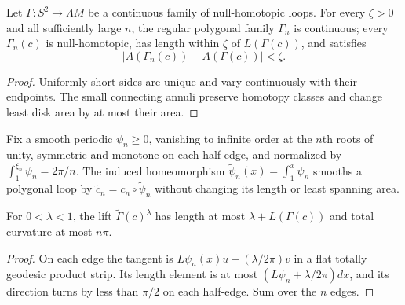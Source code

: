 \begin{corollary}
\label{cor:polygonal-approximation-of-family}
\label{Gammaapprox}
Let $\Gamma\colon S^2\to\Lambda M$ be a continuous family of null-homotopic
loops. For every $\zeta>0$ and all sufficiently large $n$, the regular
polygonal family $\Gamma_n$ is continuous; every $\Gamma_n(c)$ is
null-homotopic, has length within $\zeta$ of $L(\Gamma(c))$, and satisfies
\[
|A(\Gamma_n(c))-A(\Gamma(c))|<\zeta.
\]
\end{corollary}
\begin{proof}
\sketch Uniformly short sides are unique and vary continuously with their endpoints.
The small connecting annuli preserve homotopy classes and change least disk
area by at most their area.
\end{proof}

Fix a smooth periodic $\psi_n\ge0$, vanishing to infinite order at the
$n$th roots of unity, symmetric and monotone on each half-edge, and normalized
by $\int_1^{\xi_n}\psi_n=2\pi/n$. The induced homeomorphism
$\widetilde\psi_n(x)=\int_1^x\psi_n$ smooths a polygonal loop by
$\widetilde c_n=c_n\circ\widetilde\psi_n$ without changing its length or
least spanning area.

\begin{claim}
\label{claim:smoothed-approximation-ramp-bounds}
For $0<\lambda<1$, the lift $\widetilde\Gamma(c)^\lambda$ has length at most
$\lambda+L(\Gamma(c))$ and total curvature at most $n\pi$.
\end{claim}
\begin{proof}
\sketch On each edge the tangent is
$L\psi_n(x)u+(\lambda/2\pi)v$ in a flat totally geodesic product strip. Its
length element is at most $(L\psi_n+\lambda/2\pi)dx$, and its direction turns
by less than $\pi/2$ on each half-edge. Sum over the $n$ edges.
\end{proof}

